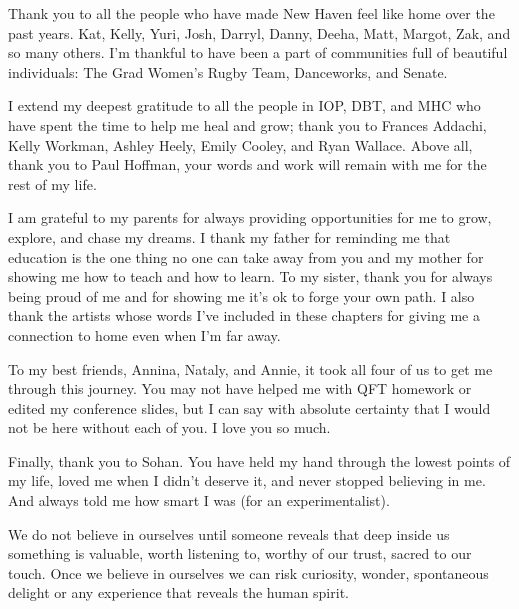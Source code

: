 Thank you to all the people who have made New Haven feel like home over the past years. Kat, Kelly, Yuri, Josh, Darryl, Danny, Deeha, Matt, Margot, Zak, and so many others. I'm thankful to have been a part of communities full of beautiful individuals: The Grad Women's Rugby Team, Danceworks, and Senate.

I extend my deepest gratitude to all the people in IOP, DBT, and MHC who have spent the time to help me heal and grow; thank you to Frances Addachi, Kelly Workman, Ashley Heely, Emily Cooley, and Ryan Wallace. Above all, thank you to Paul Hoffman, your words and work will remain with me for the rest of my life.

I am grateful to my parents for always providing opportunities for me to grow, explore, and chase my dreams. I thank my father for reminding me that education is the one thing no one can take away from you and my mother for showing me how to teach and how to learn. To my sister, thank you for always being proud of me and for showing me it's ok to forge your own path. I also thank the artists whose words I've included in these chapters for giving me a connection to home even when I'm far away. 

To my best friends, Annina, Nataly, and Annie, it took all four of us to get me through this journey. You may not have helped me with QFT homework or edited my conference slides, but I can say with absolute certainty that I would not be here without each of you. I love you so much. 

Finally, thank you to Sohan. You have held my hand through the lowest points of my life, loved me when I didn't deserve it, and never stopped believing in me. And always told me how smart I was (for an experimentalist). 

\begin{displayquote}
We do not believe in ourselves until someone reveals that deep inside us something is valuable, worth listening to, worthy of our trust, sacred to our touch. Once we believe in ourselves we can risk curiosity, wonder, spontaneous delight or any experience that reveals the human spirit.
\end{displayquote}